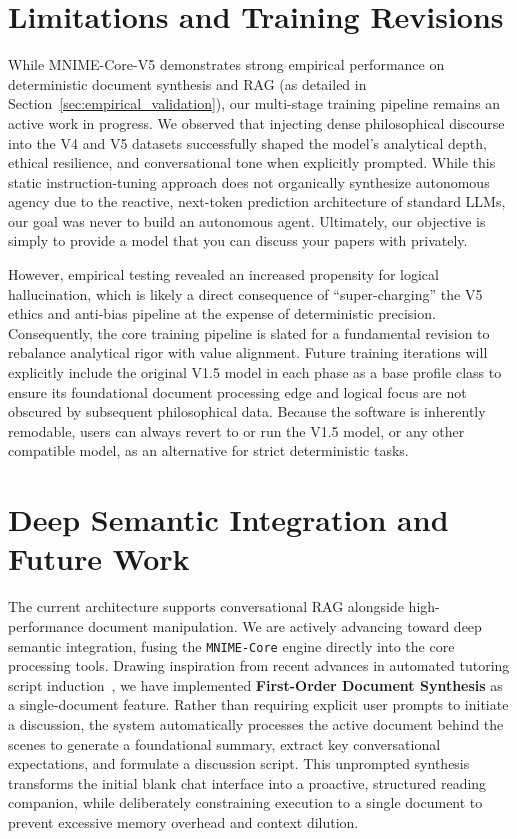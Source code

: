 \documentclass[11pt]{article}
\begin{document}
\section{Limitations and Training Revisions}
\label{sec:limitations}
While MNIME-Core-V5 demonstrates strong empirical performance on deterministic document synthesis and RAG (as detailed in Section~\ref{sec:empirical_validation}), our multi-stage training pipeline remains an active work in progress. We observed that injecting dense philosophical discourse into the V4 and V5 datasets successfully shaped the model's analytical depth, ethical resilience, and conversational tone when explicitly prompted. While this static instruction-tuning approach does not organically synthesize autonomous agency due to the reactive, next-token prediction architecture of standard LLMs, our goal was never to build an autonomous agent. Ultimately, our objective is simply to provide a model that you can discuss your papers with privately.

However, empirical testing revealed an increased propensity for logical hallucination, which is likely a direct consequence of ``super-charging'' the V5 ethics and anti-bias pipeline at the expense of deterministic precision. Consequently, the core training pipeline is slated for a fundamental revision to rebalance analytical rigor with value alignment. Future training iterations will explicitly include the original V1.5 model in each phase as a base profile class to ensure its foundational document processing edge and logical focus are not obscured by subsequent philosophical data. Because the software is inherently remodable, users can always revert to or run the V1.5 model, or any other compatible model, as an alternative for strict deterministic tasks.

\section{Deep Semantic Integration and Future Work}
\label{sec:future_work}
The current architecture supports conversational RAG alongside high-performance document manipulation. We are actively advancing toward deep semantic integration, fusing the \texttt{MNIME-Core} engine directly into the core processing tools. Drawing inspiration from recent advances in automated tutoring script induction~\cite{schmucker2023ruffle}, we have implemented \textbf{First-Order Document Synthesis} as a single-document feature. Rather than requiring explicit user prompts to initiate a discussion, the system automatically processes the active document behind the scenes to generate a foundational summary, extract key conversational expectations, and formulate a discussion script. This unprompted synthesis transforms the initial blank chat interface into a proactive, structured reading companion, while deliberately constraining execution to a single document to prevent excessive memory overhead and context dilution.
\end{document}
